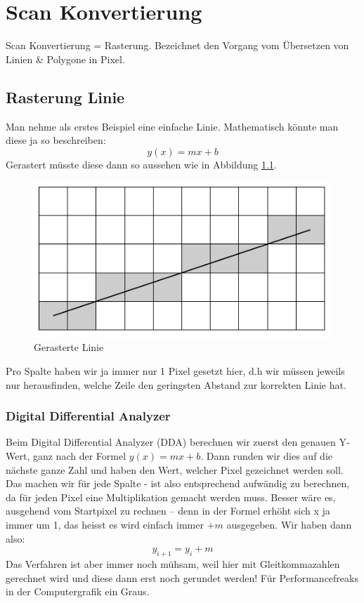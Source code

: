 \chapter{Scan Konvertierung}
Scan Konvertierung = Rasterung. Bezeichnet den Vorgang vom Übersetzen von Linien \& Polygone in Pixel.
\section{Rasterung Linie}
Man nehme als erstes Beispiel eine einfache Linie. Mathematisch könnte man diese ja so beschreiben:
\begin{displaymath}
y(x)=mx+b
\end{displaymath}
Gerastert müsste diese dann so aussehen wie in Abbildung \ref{fig:gerasterte_linie}.
\begin{figure}[!ht]
	\centering
	\includegraphics[width=0.4\linewidth]{fig/gerasterte_linie}
	\caption{Gerasterte Linie}
	\label{fig:gerasterte_linie}
\end{figure}
Pro Spalte haben wir ja immer nur 1 Pixel gesetzt hier, d.h wir müssen jeweils nur herausfinden, welche Zeile den geringsten Abstand zur korrekten Linie hat.



\subsection{Digital Differential Analyzer}
Beim Digital Differential Analyzer (DDA) berechnen wir zuerst den genauen Y-Wert, ganz nach der Formel \(y(x)=mx+b\). Dann runden wir dies auf die nächste ganze Zahl und haben den Wert, welcher Pixel gezeichnet werden soll. Das machen wir für jede Spalte - ist also entsprechend aufwändig zu berechnen, da für jeden Pixel eine Multiplikation gemacht werden muss. Besser wäre es, ausgehend vom Startpixel zu rechnen -- denn in der Formel erhöht sich x ja immer um 1, das heisst es wird einfach immer \(+ m\) ausgegeben. Wir haben dann also:
\begin{displaymath}
y_{i+1}=y_i+m
\end{displaymath}
Das Verfahren ist aber immer noch mühsam, weil hier mit Gleitkommazahlen gerechnet wird und diese dann erst noch gerundet werden! Für Performancefreaks in der Computergrafik ein Graus.

